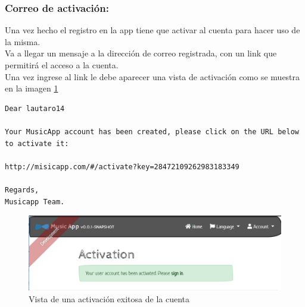 \newpage

\subsubsection{Correo de activación:}
Una vez hecho el registro en la app tiene que activar al cuenta para hacer uso de la misma.\\

Va a llegar un mensaje a la dirección de correo registrada, con un link que permitirá el acceso a la cuenta.\\

Una vez ingrese al link le debe aparecer una vista de activación como se muestra en la imagen \ref{fig:activation}\\


\begin{lstlisting}
Dear lautaro14

Your MusicApp account has been created, please click on the URL below to activate it:

http://misicapp.com/#/activate?key=28472109262983183349

Regards, 
Musicapp Team.
\end{lstlisting}

\begin{figure}[h!]
 \centering
\includegraphics[width=\linewidth]{Desarrollo/Interfaces/Interfaces/imgs/activation.PNG}
\caption{Vista de una activación exitosa de la cuenta}
\label{fig:activation}
\end{figure}

